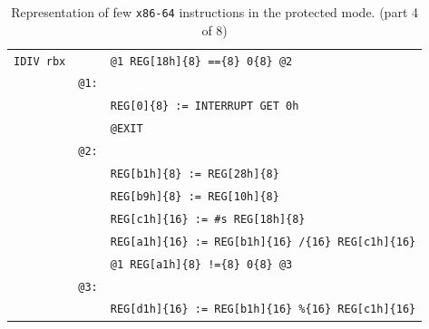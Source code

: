 \documentclass[10pt,twocolumn]{article}
\begin{document}
\begin{table}[!h]
\begin{center}
\begin{tabular}{r|rl}
\texttt{IDIV rbx} & %
& \texttt{@1 REG[18h]\{8\} ==\{8\} 0\{8\} @2} \\ & %
\texttt{@1:} \\ & %
& \texttt{REG[0]\{8\} := INTERRUPT GET 0h} \\ & %
& \texttt{@EXIT} \\ & %
\texttt{@2:} \\ & %
& \texttt{REG[b1h]\{8\} := REG[28h]\{8\}} \\ & %
& \texttt{REG[b9h]\{8\} := REG[10h]\{8\}} \\ & %
& \texttt{REG[c1h]\{16\} := \#s REG[18h]\{8\}} \\ & %
& \texttt{REG[a1h]\{16\} := REG[b1h]\{16\} /\{16\} REG[c1h]\{16\}} \\ & %
& \texttt{@1 REG[a1h]\{8\} !=\{8\} 0\{8\} @3} \\ & %
\texttt{@3:} \\ & %
& \texttt{REG[d1h]\{16\} := REG[b1h]\{16\} \%\{16\} REG[c1h]\{16\}} %

\end{tabular}
\end{center}
\caption{Representation of few \texttt{x86-64} instructions in the
protected mode. (part 4 of 8)}
\end{table}

\clearpage
\end{document}
